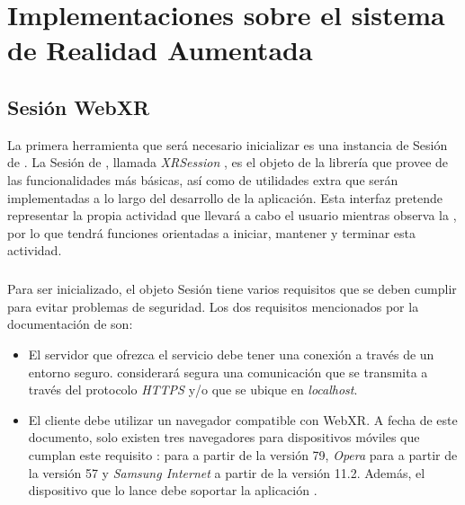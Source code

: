 \documentclass{subfiles}
\begin{document}
    \chapter{Implementaciones sobre el sistema de Realidad Aumentada}
    \label{chap:implementaciones_sobre_el_sistema_de_realidad_aumentada}
    
        \section{Sesión WebXR}
        \label{sec:sesion_webxr}

        La primera herramienta que será necesario inicializar es una instancia de Sesión de \webxr. La Sesión de \webxr, llamada \textit{XRSession} \cite{web:xrsession}, es el objeto de la librería \webxr que provee de las funcionalidades más básicas, así como de utilidades extra que serán implementadas a lo largo del desarrollo de la aplicación. Esta interfaz pretende representar la propia actividad que llevará a cabo el usuario mientras observa la \ra, por lo que tendrá funciones orientadas a iniciar, mantener y terminar esta actividad.

        \paragraph{}
        Para ser inicializado, el objeto Sesión tiene varios requisitos que se deben cumplir \cite{web:webxrrequirements} para evitar problemas de seguridad. Los dos requisitos mencionados por la documentación de \arcore son:

        \begin{itemize}
            \item {El servidor que ofrezca el servicio debe tener una conexión a través de un entorno seguro. \webxr considerará segura una comunicación que se transmita a través del protocolo \textit{HTTPS} y/o que se ubique en \textit{localhost}}.
            \item {El cliente debe utilizar un navegador compatible con WebXR. A fecha de este documento, solo existen tres navegadores para dispositivos móviles que cumplan este requisito \cite{web:webxrcompatibility}: \googlechrome para \android a partir de la versión 79, \textit{Opera} para \android a partir de la versión 57 y \textit{Samsung Internet} a partir de la versión 11.2. Además, el dispositivo que lo lance debe soportar la aplicación \arcore.}
        \end{itemize}
\end{document}
